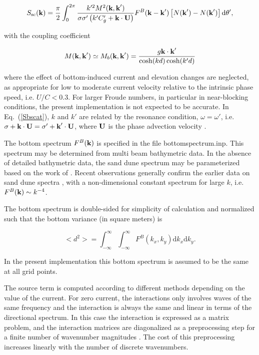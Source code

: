 \begin{equation}
 S_{\mathrm{sc}}({\mbox{\bf k}}) =
\frac{\pi}{2}\int_{0}^{2 \pi}
 \frac{k'^2 M^2({\mbox{\bf k}},\textbf{k}')}{\sigma \sigma' \left(k' C'_g +
{\mbox{\bf k}}  \cdot {\bf U}  \right)}
 F^B({\mbox{\bf k}}-\textbf{k}')
\left[N(\textbf{k}')- N(\textbf{k}')\right] {\mathrm d}
\theta',\label{Sbscat}
\end{equation}

\noindent
with the coupling coefficient

\begin{equation}
M({\mbox{\bf k}},{\mbox{\bf k}}^\prime)\simeq M_b({\mbox{\bf k}},{\mbox{\bf k}}^\prime) =\frac{g {\mbox{\bf k}}
\cdot {\mbox{\bf k}}^\prime}{\cosh(kd)\cosh(k'd)}
\end{equation}

\noindent
 where the effect of bottom-induced current and elevation changes are
neglected, as appropriate for low to moderate current velocity relative to the
intrinsic phase speed, i.e. $U/C < 0.3$. For larger Froude numbers, in
particular in near-blocking conditions, the present implementation is not
expected to be accurate.  In Eq.~(\ref{Sbscat}), $k$ and $k'$ are related by
the resonance condition, $\omega=\omega'$, i.e. $\sigma+{\mbox{\bf k}} \cdot {\bf U}
=\sigma' + {\mbox{\bf k}}^\prime \cdot {\bf U}$, where ${\bf U}$ is the phase advection
velocity \cite[see, e.g.,][]{art:WISE07}.

The bottom spectrum $F^B({\mbox{\bf k}})$ is specified in the file {\file
bottomspectrum.inp}. This spectrum may be determined from multi beam
bathymetric data.  In the absence of detailed bathymetric data, the sand dune
spectrum may be parameterized based on the work of \cite{art:Hino68}.  Recent
observations generally confirm the earlier data on sand dune spectra
\citep{art:AM07}, with a non-dimensional constant spectrum for large $k$,
i.e. $F^B({\mbox{\bf k}}) \sim k^{-4}$.

The bottom spectrum is double-sided for simplicity of calculation
and normalized such that the bottom variance (in square meters) is

\begin{equation}
<d^2> =\int_{-\infty}^{\infty} \int_{-\infty}^{\infty}
F^B(k_x,k_y)  {\mathrm d} k_x  {\mathrm d} k_y.
\end{equation}

\noindent
In the present implementation this bottom spectrum is assumed to be the same
at all grid points.

The source term is computed according to different methods depending on the
value of the current. For zero current, the interactions only involves waves
of the same frequency and the interaction is always the same and linear in
terms of the directional spectrum. In this case the interaction is expressed
as a matrix problem, and the interaction matrices are diagonalized as a
preprocessing step for a finite number of wavenumber magnitudes
\citep{art:AH02}.  The cost of this preprocessing increases linearly with the
number of discrete wavenumbers.

